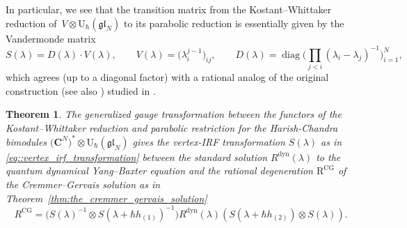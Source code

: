 \documentclass[10pt,a4paper]{amsart}
\numberwithin{equation}{section}
\newtheorem{Theorem}{Theorem}[section]
\newcommand{\CG}{\mathrm{CG}}
\newcommand{\C}{\mathbf{C}}
\newcommand{\R}{\mathrm{R}}
\newcommand{\U}{\mathrm{U}_{\hbar}}
\newcommand{\dyn}{\mathrm{dyn}}
\newcommand{\gl}{\mathfrak{gl}}
\begin{document}
	In particular, we see that the transition matrix from the Kostant--Whittaker reduction of~$V \otimes \U(\gl_N)$ to its parabolic reduction is essentially given by the Vandermonde matrix
	\begin{equation}
		\label{eq::vertex_irf_transformation}
		S(\lambda) = D(\lambda) \cdot V(\lambda), \qquad V(\lambda) = \bigl(\lambda_i^{j-1}\bigr)_{ij}, \qquad D(\lambda) = \operatorname{diag}\Big(\prod_{j<i} (\lambda_i-\lambda_j)^{-1} \Big)_{i=1}^N,
	\end{equation}
	which agrees (up to a diagonal factor) with a rational analog of the original construction \cite{CremmerGervais} (see also \cite{BuffenoirRocheTerras}) studied in \cite{BalogDabrowskiFeher}.
	

	\begin{Theorem}
		\label{thm:the_vertex_irf_transformation}
		The generalized gauge transformation between the functors of the Kostant--Whittaker reduction and parabolic restriction for the Harish-Chandra bimodules $\bigl(\C^N\bigr)^* \otimes \U(\gl_N)$ gives the vertex-IRF transformation $S(\lambda)$ as in \eqref{eq::vertex_irf_transformation} between the standard solution $R^{\dyn}(\lambda)$ to the quantum dynamical Yang--Baxter equation and the rational degeneration $\R^{\CG}$ of the Cremmer--Gervais solution as in Theorem~{\rm\ref{thm:the_cremmer_gervais_solution}}
		\[
		R^{\CG} = \bigl(S(\lambda)^{-1} \otimes S(\lambda+\hbar h_{(1)})^{-1} \bigr) R^{\dyn}(\lambda) (S(\lambda+\hbar h_{(2)}) \otimes S(\lambda)).
		\]
	\end{Theorem}

	
\end{document}
